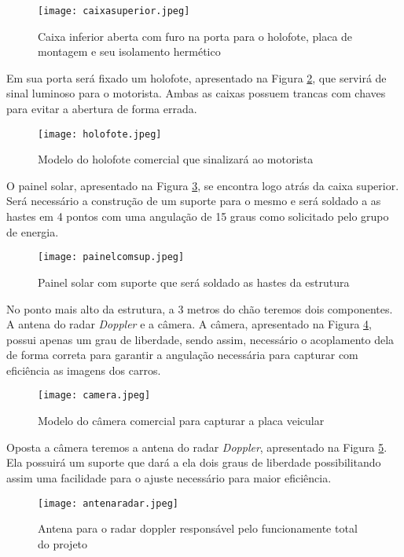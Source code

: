 \begin{figure}[h]
	\centering
    \texttt{[image: caixasuperior.jpeg]}
    \caption{Caixa inferior aberta com furo na porta para o holofote, placa de montagem e seu isolamento hermético}
    \label{caixasup}
\end{figure}

Em sua porta será fixado um holofote, apresentado na Figura \ref{holof}, que servirá de sinal luminoso para o motorista. Ambas as caixas possuem trancas com chaves para evitar a abertura de forma errada.

\begin{figure}[h]
	\centering
    \texttt{[image: holofote.jpeg]}
    \caption{Modelo do holofote comercial que sinalizará ao motorista}
    \label{holof}
\end{figure}

O painel solar, apresentado na Figura \ref{painelsol}, se encontra logo atrás da caixa superior. Será necessário a construção de um suporte para o mesmo e será soldado a as hastes em 4 pontos com uma angulação de 15 graus como solicitado pelo grupo de energia. 

\begin{figure}[h]
	\centering
    \texttt{[image: painelcomsup.jpeg]}
    \caption{Painel solar com suporte que será soldado as hastes da estrutura}
    \label{painelsol}
\end{figure}

No ponto mais alto da estrutura, a 3 metros do chão teremos dois componentes. A antena do radar \textit{Doppler} e a câmera. A câmera, apresentado na Figura \ref{camera}, possui apenas um grau de liberdade, sendo assim, necessário o acoplamento dela de forma correta para garantir a angulação necessária para capturar com eficiência as imagens dos carros. 

\begin{figure}[h]
	\centering
    \texttt{[image: camera.jpeg]}
    \caption{Modelo do câmera comercial para capturar a placa veicular}
    \label{camera}
\end{figure}

Oposta a câmera teremos a antena do radar \textit{Doppler}, apresentado na Figura \ref{antrad}. Ela possuirá um suporte que dará a ela dois graus de liberdade possibilitando assim uma facilidade para o ajuste necessário para maior eficiência. 

\begin{figure}[h]
	\centering
    \texttt{[image: antenaradar.jpeg]}
    \caption{Antena para o radar doppler responsável pelo funcionamente total do projeto}
    \label{antrad}
\end{figure}

